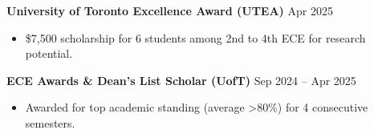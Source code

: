 \documentclass[letterpaper,10pt]{article}
\begin{document}
\noindent\textbf{University of Toronto Excellence Award (UTEA)} \hfill Apr 2025
\begin{itemize}[leftmargin=0.2in]
    \item \$7,500 scholarship for 6 students among 2nd to 4th ECE for research potential.
\end{itemize}

\vspace{0.3cm}
\noindent\textbf{ECE Awards \& Dean's List Scholar (UofT)} \hfill Sep 2024 -- Apr 2025
\begin{itemize}[leftmargin=0.2in]
    \item Awarded for top academic standing (average \textgreater 80\%) for 4 consecutive semesters.
\end{itemize}
\end{document}
